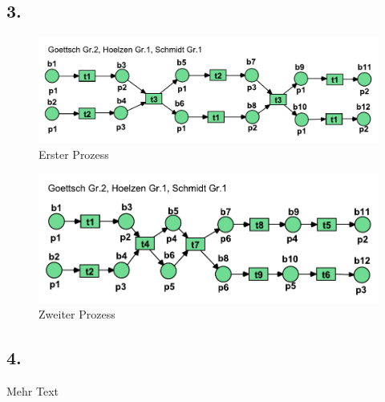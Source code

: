 \documentclass[12pt, paper=a4]{article}
\begin{document}
\subsection*{3.}
\begin{figure}[h!]
	\includegraphics*[scale = 0.7]{Erster_Prozess_8_3.pdf}
	\caption{Erster Prozess}
\end{figure} 
\begin{figure}[h!]
	\includegraphics*[scale = 0.7]{Zweiter_Prozess_8_3.pdf}
	\caption{Zweiter Prozess}
\end{figure} 

\subsection*{4.}
Mehr Text
\end{document}
